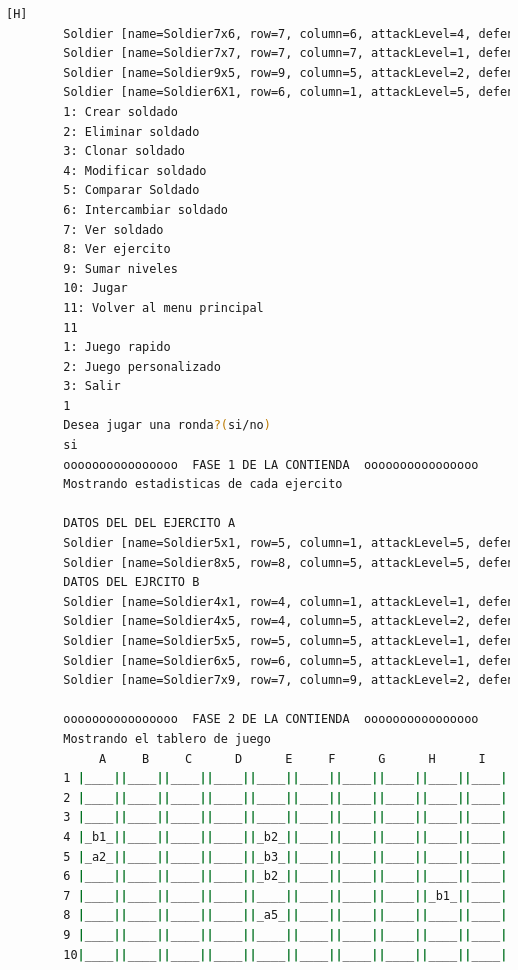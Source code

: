 \documentclass{article}
\begin{document}
\begin{lstlisting}[language=bash,caption={Compilando y probando el programa completo  }][H]
		Soldier [name=Soldier7x6, row=7, column=6, attackLevel=4, defenseLevel=2, actualLife=1, speed=0, attitude=Repose, current=true]
		Soldier [name=Soldier7x7, row=7, column=7, attackLevel=1, defenseLevel=4, actualLife=4, speed=0, attitude=Repose, current=true]
		Soldier [name=Soldier9x5, row=9, column=5, attackLevel=2, defenseLevel=5, actualLife=1, speed=0, attitude=Repose, current=true]
		Soldier [name=Soldier6X1, row=6, column=1, attackLevel=5, defenseLevel=5, actualLife=5, speed=2, attitude=offensive, current=true]
		1: Crear soldado
		2: Eliminar soldado
		3: Clonar soldado
		4: Modificar soldado
		5: Comparar Soldado
		6: Intercambiar soldado
		7: Ver soldado
		8: Ver ejercito
		9: Sumar niveles
		10: Jugar
		11: Volver al menu principal
		11
		1: Juego rapido
		2: Juego personalizado
		3: Salir
		1
		Desea jugar una ronda?(si/no)
		si
		oooooooooooooooo  FASE 1 DE LA CONTIENDA  oooooooooooooooo
		Mostrando estadisticas de cada ejercito
		
		DATOS DEL DEL EJERCITO A
		Soldier [name=Soldier5x1, row=5, column=1, attackLevel=5, defenseLevel=1, actualLife=2, speed=0, attitude=Repose, current=true]
		Soldier [name=Soldier8x5, row=8, column=5, attackLevel=5, defenseLevel=4, actualLife=5, speed=0, attitude=Repose, current=true]
		DATOS DEL EJRCITO B
		Soldier [name=Soldier4x1, row=4, column=1, attackLevel=1, defenseLevel=3, actualLife=1, speed=0, attitude=Repose, current=true]
		Soldier [name=Soldier4x5, row=4, column=5, attackLevel=2, defenseLevel=2, actualLife=2, speed=0, attitude=Repose, current=true]
		Soldier [name=Soldier5x5, row=5, column=5, attackLevel=1, defenseLevel=5, actualLife=3, speed=0, attitude=Repose, current=true]
		Soldier [name=Soldier6x5, row=6, column=5, attackLevel=1, defenseLevel=2, actualLife=2, speed=0, attitude=Repose, current=true]
		Soldier [name=Soldier7x9, row=7, column=9, attackLevel=2, defenseLevel=4, actualLife=1, speed=0, attitude=Repose, current=true]
		
		oooooooooooooooo  FASE 2 DE LA CONTIENDA  oooooooooooooooo
		Mostrando el tablero de juego
			 A     B     C      D      E     F      G      H      I     J 
		1 |____||____||____||____||____||____||____||____||____||____|
		2 |____||____||____||____||____||____||____||____||____||____|
		3 |____||____||____||____||____||____||____||____||____||____|
		4 |_b1_||____||____||____||_b2_||____||____||____||____||____|
		5 |_a2_||____||____||____||_b3_||____||____||____||____||____|
		6 |____||____||____||____||_b2_||____||____||____||____||____|
		7 |____||____||____||____||____||____||____||____||_b1_||____|
		8 |____||____||____||____||_a5_||____||____||____||____||____|
		9 |____||____||____||____||____||____||____||____||____||____|
		10|____||____||____||____||____||____||____||____||____||____|
		

\end{lstlisting}
\end{document}
